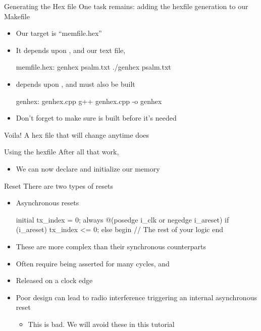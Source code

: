\documentclass[style=gt,mode=present,paper=screen]{powerdot}
\begin{document}
%
%
\begin{slide}[bm=,toc=,method=direct]{Generating the Hex file}
One task remains: adding the hexfile generation to our Makefile
\begin{itemize}
\item Our target is ``memfile.hex''
\item It depends upon , and our text file,
\begin{zmake}
memfile.hex: genhex psalm.txt
	./genhex psalm.txt
\end{zmake}
\item {} depends upon , and must also be
	built
\begin{zmake}
genhex: genhex.cpp
	g++ genhex.cpp -o genhex
\end{zmake}
\item Don't forget to make sure  is built before it's needed
\end{itemize}
Voila!  A hex file that will change anytime  does
\end{slide}
%
%
\begin{slide}[bm=,toc=,method=direct]{Using the hexfile}
After all that work,
\begin{itemize}
\item We can now declare and initialize our memory
\end{itemize}
\end{slide}
%
%
\begin{slide}[method=file]{Reset}
There are two types of resets
\begin{itemize}
\item Asynchronous resets
\begin{zformal}
initial tx_index = 0;
always @(posedge i_clk or negedge i_areset)
if (i_areset)
        tx_index <= 0;
else begin
        // The rest of your logic
end
\end{zformal}
\item These are more complex than their synchronous counterparts
\item Often require being asserted for many cycles, and
\item Released on a clock edge
\item Poor design can lead to radio interference triggering
      an internal asynchronous reset
\pause
	\begin{itemize}
	\item This is bad.  \pause We will avoid these in this tutorial
	\end{itemize}
\end{itemize}
\end{slide}
\end{document}

